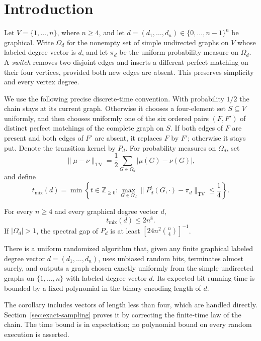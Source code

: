 \section{Introduction}
\label{sec:introduction}
Let $V=\{1,\ldots,n\}$, where $n\ge4$, and let
$d=(d_1,\ldots,d_n)\in\{0,\ldots,n-1\}^n$ be graphical.
Write $\Omega_d$ for the nonempty set of simple undirected graphs on $V$
whose labeled degree vector is $d$, and let $\pi_d$ be the uniform
probability measure on $\Omega_d$. A \emph{switch} removes two disjoint
edges and inserts a different perfect matching on their four vertices,
provided both new edges are absent. This preserves simplicity and
every vertex degree.

We use the following precise discrete-time convention. With probability
$1/2$ the chain stays at its current graph. Otherwise it chooses a
four-element set $S\subseteq V$ uniformly, and then chooses uniformly
one of the six ordered pairs $(F,F')$ of distinct perfect matchings of
the complete graph on $S$. If both edges of $F$ are present and both
edges of $F'$ are absent, it replaces $F$ by $F'$; otherwise it stays
put. Denote the transition kernel by $P_d$. For probability measures
on $\Omega_d$, set
\[
 \|\mu-\nu\|_{\mathrm{TV}}
 =\frac12\sum_{G\in\Omega_d}|\mu(G)-\nu(G)|,
\]
and define
\[
 t_{\mathrm{mix}}(d)
 =\min\left\{t\in\mathbb Z_{\ge0}:
 \max_{G\in\Omega_d}\|P_d^t(G,\cdot)-\pi_d\|_{\mathrm{TV}}
 \le\frac14\right\}.
\]

\begin{theorem}\label{thm:main}
For every $n\ge4$ and every graphical degree vector $d$,
\[
 t_{\mathrm{mix}}(d)\le 2n^8.
\]
If $|\Omega_d|>1$, the spectral gap of $P_d$ is at least
$[24n^2\binom n4]^{-1}$.
\end{theorem}

\begin{samepage}
\begin{corollary}\label{cor:exact-sampling}
There is a uniform randomized algorithm that, given any finite graphical
labeled degree vector $d=(d_1,\ldots,d_n)$, uses unbiased random bits,
terminates almost surely, and outputs a graph chosen exactly uniformly
from the simple undirected graphs on $\{1,\ldots,n\}$ with labeled
degree vector $d$. Its expected bit running time is bounded by a fixed
polynomial in the binary encoding length of $d$.
\end{corollary}

The corollary includes vectors of length less than four, which are
handled directly. Section~\ref{sec:exact-sampling} proves it by
correcting the finite-time law of the chain. The time bound is in
expectation; no polynomial bound on every random execution is asserted.
\end{samepage}

